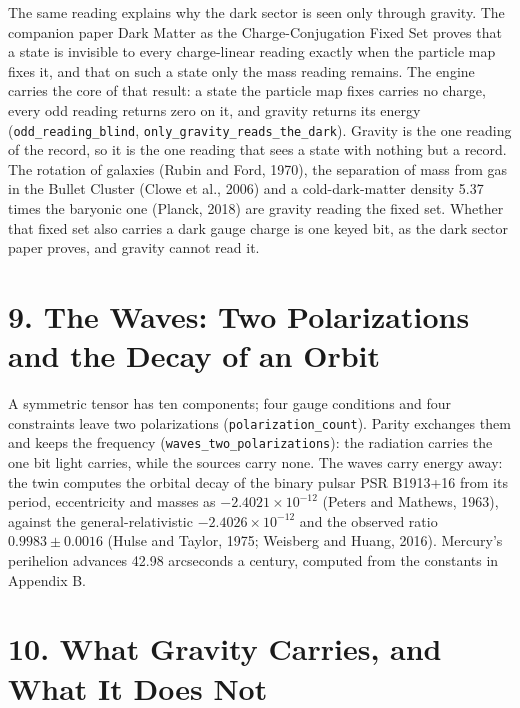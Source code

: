 \documentclass[10pt]{article}
\begin{document}
The same reading explains why the dark sector is seen only through
gravity. The companion paper Dark Matter as the Charge-Conjugation Fixed
Set proves that a state is invisible to every charge-linear reading
exactly when the particle map fixes it, and that on such a state only
the mass reading remains. The engine carries the core of that result: a
state the particle map fixes carries no charge, every odd reading
returns zero on it, and gravity returns its energy
(\texttt{odd\_reading\_blind},
\texttt{only\_gravity\_reads\_the\_dark}). Gravity is the one reading of
the record, so it is the one reading that sees a state with nothing but
a record. The rotation of galaxies (Rubin and Ford, 1970), the
separation of mass from gas in the Bullet Cluster (Clowe et al., 2006)
and a cold-dark-matter density 5.37 times the baryonic one (Planck,
2018) are gravity reading the fixed set. Whether that fixed set also
carries a dark gauge charge is one keyed bit, as the dark sector paper
proves, and gravity cannot read it.

\hypertarget{the-waves-two-polarizations-and-the-decay-of-an-orbit}{%
\section{9. The Waves: Two Polarizations and the Decay of an
Orbit}\label{the-waves-two-polarizations-and-the-decay-of-an-orbit}}

A symmetric tensor has ten components; four gauge conditions and four
constraints leave two polarizations (\texttt{polarization\_count}).
Parity exchanges them and keeps the frequency
(\texttt{waves\_two\_polarizations}): the radiation carries the one bit
light carries, while the sources carry none. The waves carry energy
away: the twin computes the orbital decay of the binary pulsar PSR
B1913+16 from its period, eccentricity and masses as
\(-2.4021\times10^{-12}\) (Peters and Mathews, 1963), against the
general-relativistic \(-2.4026\times10^{-12}\) and the observed ratio
\(0.9983\pm0.0016\) (Hulse and Taylor, 1975; Weisberg and Huang, 2016).
Mercury's perihelion advances 42.98 arcseconds a century, computed from
the constants in Appendix B.

\hypertarget{what-gravity-carries-and-what-it-does-not}{%
\section{10. What Gravity Carries, and What It Does
Not}\label{what-gravity-carries-and-what-it-does-not}}
\end{document}
